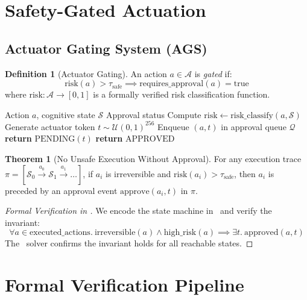 \documentclass[12pt]{article}
\theoremstyle{definition}
\newtheorem{definition}{Definition}[section]
\newtheorem{theorem}{Theorem}[section]
\newcommand{\state}{\mathcal{S}}
\newcommand{\action}{\mathcal{A}}
\newcommand{\zthree}{\text{Z3}}
\begin{document}
\section{Safety-Gated Actuation}

\subsection{Actuator Gating System (AGS)}

\begin{definition}[Actuator Gating]
An action $a \in \action$ is \emph{gated} if:
\[
\text{risk}(a) > \tau_{\text{safe}} \implies \text{requires\_approval}(a) = \text{true}
\]
where $\text{risk}: \action \to [0,1]$ is a formally verified risk classification function.
\end{definition}

\begin{algorithm}
\caption{Actuator Gating Protocol}
\begin{algorithmic}[1]
\REQUIRE Action $a$, cognitive state $\state$
\ENSURE Approval status
\STATE Compute $\text{risk} \gets \text{risk\_classify}(a, \state)$
    \STATE Generate actuator token $t \sim \mathcal{U}(0,1)^{256}$
    \STATE Enqueue $(a, t)$ in approval queue $\mathcal{Q}$
    \STATE \textbf{return} $\text{PENDING}(t)$
\ELSE
    \STATE \textbf{return} $\text{APPROVED}$
\ENDIF
\end{algorithmic}
\end{algorithm}

\begin{theorem}[No Unsafe Execution Without Approval]
For any execution trace $\pi = [\state_0 \xrightarrow{a_0} \state_1 \xrightarrow{a_1} \dots]$, if $a_i$ is irreversible and $\text{risk}(a_i) > \tau_{\text{safe}}$, then $a_i$ is preceded by an approval event $\text{approve}(a_i, t)$ in $\pi$.
\end{theorem}

\begin{proof}[Formal Verification in \zthree]
We encode the state machine in \zthree\ and verify the invariant:
\[
\forall a \in \text{executed\_actions}.\ \text{irreversible}(a) \land \text{high\_risk}(a) \implies \exists t.\ \text{approved}(a, t)
\]
The \zthree\ solver confirms the invariant holds for all reachable states.
\end{proof}

\section{Formal Verification Pipeline}
\end{document}

